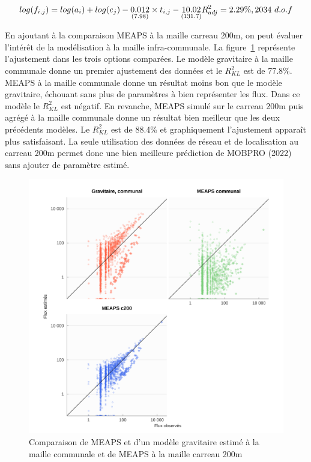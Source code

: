 \documentclass[
  10pt,
  a4paper,
  numbers=noendperiod,
  DIV=9]{scrartcl}
\begin{document}
\[
log(f_{i,j}) = log(a_i) + log(e_j) - \underset{(7.98)}{0.012} \times t_{i,j} - \underset{(131.7)}{10.02} \\
R^2_{adj} = 2.29\%, 2034\ d.o.f
\]

En ajoutant à la comparaison MEAPS à la maille carreau 200m, on peut
évaluer l'intérêt de la modélisation à la maille infra-communale. La
figure~\ref{fig-divmailles} représente l'ajustement dans les trois
options comparées. Le modèle gravitaire à la maille communale donne un
premier ajustement des données et le \(R^2_{KL}\) est de 77.8\%. MEAPS à
la maille communale donne un résultat moins bon que le modèle
gravitaire, échouant sans plus de paramètres à bien représenter les
flux. Dans ce modèle le \(R^2_{KL}\) est négatif. En revanche, MEAPS
simulé sur le carreau 200m puis agrégé à la maille communale donne un
résultat bien meilleur que les deux précédents modèles. Le \(R^2_{KL}\)
est de 88.4\% et graphiquement l'ajustement apparaît plus satisfaisant.
La seule utilisation des données de réseau et de localisation au carreau
200m permet donc une bien meilleure prédiction de MOBPRO (2022) sans
ajouter de paramètre estimé.

\begin{figure}[htb]

{\centering \includegraphics[width=1\textwidth,height=\textheight]{larochelle_files/figure-pdf/fig-divmailles-1.png}

}

\caption{\label{fig-divmailles}Comparaison de MEAPS et d'un modèle
gravitaire estimé à la maille communale et de MEAPS à la maille carreau
200m}

\end{figure}
\end{document}

